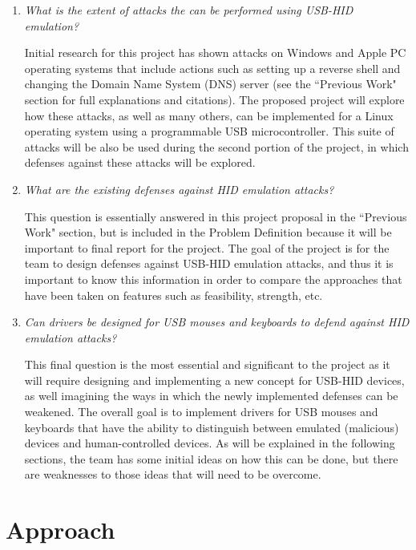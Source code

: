 \documentclass{ieee}
\begin{document}
\begin{enumerate}
\item \textit{What is the extent of attacks the can be performed using USB-HID emulation?}

Initial research for this project has shown attacks on Windows and Apple PC operating systems that include actions such as setting up a reverse shell and changing the Domain Name System (DNS) server (see the ``Previous Work" section for full explanations and citations). The proposed project will explore how these attacks, as well as many others, can be implemented for a  Linux operating system using a programmable USB microcontroller. This suite of attacks will be also be used during the second portion of the project, in which defenses against these attacks will be explored.

\item \textit{What are the existing defenses against HID emulation attacks?}

This question is essentially answered in this project proposal in the ``Previous Work" section, but is included in the Problem Definition because it will be important to final report for the project. The goal of the project is for the team to design defenses against USB-HID emulation attacks, and thus it is important to know this information  in order to compare the approaches that have been taken on features such as feasibility, strength, etc.

\item \textit{Can drivers be designed for USB mouses and keyboards to defend against HID emulation attacks?}

This final question is the most essential and significant to the project as it will require designing and implementing a new concept for USB-HID devices, as well imagining the ways in which the newly implemented defenses can be weakened. The overall goal is to implement drivers for USB mouses and keyboards that have the ability to distinguish between emulated (malicious) devices and human-controlled devices. As will be explained in the following sections, the team has some initial ideas on how this can be done, but there are weaknesses to those ideas that will need to be overcome.

\end{enumerate}

\section{Approach}
\end{document}
